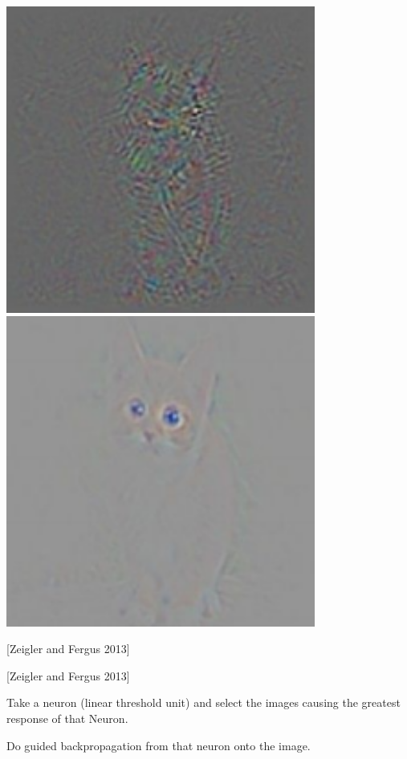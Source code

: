 {\centerline{\includegraphics[width = 4in]{../images/DeconvUnguided} \hfill \includegraphics[width=4in]{../images/DeconvGuided}}

\centerline{[Zeigler and Fergus 2013]}


\centerline{[Zeigler and Fergus 2013]}

\vfill
Take a neuron (linear threshold unit) and select the images causing the greatest response of that Neuron.

\vfill
Do guided backpropagation from that neuron onto the image.


}
